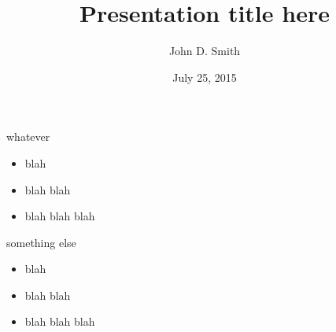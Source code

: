 \documentclass{article}
\title{\bf Presentation title here}
\author{John D. Smith}
\date{July 25, 2015}
\begin{document}
\maketitleslide





whatever

\begin{itemize}
\item blah
\item blah blah
\item blah blah blah
\end{itemize}

\newpage



something else

\begin{itemize}
\item blah
\item blah blah
\item blah blah blah
\end{itemize}
\end{document}
